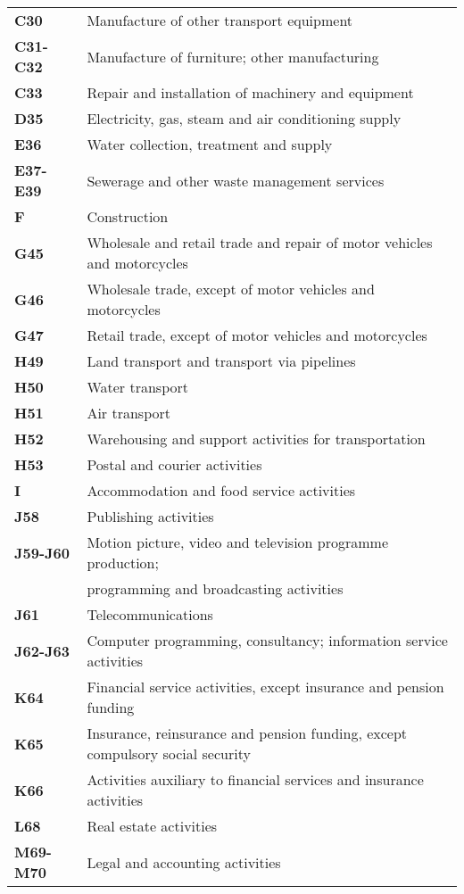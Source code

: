 \documentclass[12pt,a4paper]{article}
\begin{document}
\begin{table}[H]
\begin{tabular}{ll}
\textbf{C30} &{Manufacture of other transport equipment}\\
\textbf{C31-C32} &{Manufacture of furniture; other manufacturing}\\
\textbf{C33} &{Repair and installation of machinery and equipment}\\
\textbf{D35} &{Electricity, gas, steam and air conditioning supply}\\
\textbf{E36} &{Water collection, treatment and supply}\\
\textbf{E37-E39} &{Sewerage and other waste management services}\\
\textbf{F} &{Construction}\\
\textbf{G45} &{Wholesale and retail trade and repair of motor vehicles and motorcycles}\\
\textbf{G46} &{Wholesale trade, except of motor vehicles and motorcycles}\\
\textbf{G47} &{Retail trade, except of motor vehicles and motorcycles}\\
\textbf{H49} &{Land transport and transport via pipelines}\\
\textbf{H50} &{Water transport}\\
\textbf{H51} &{Air transport}\\
\textbf{H52} &{Warehousing and support activities for transportation}\\
\textbf{H53} &{Postal and courier activities}\\
\textbf{I} &{Accommodation and food service activities}\\
\textbf{J58} &{Publishing activities}\\
\textbf{J59-J60} &{Motion picture, video and television programme production;}\\
&{programming and broadcasting activities}\\
\textbf{J61} &{Telecommunications}\\
\textbf{J62-J63} &{Computer programming, consultancy; information service activities}\\
\textbf{K64} &{Financial service activities, except insurance and pension funding}\\
\textbf{K65} &{Insurance, reinsurance and pension funding, except compulsory social security}\\
\textbf{K66} &{Activities auxiliary to financial services and insurance activities}\\
\textbf{L68} &{Real estate activities}\\
\textbf{M69-M70} &{Legal and accounting activities}\\

\end{tabular}
\end{table}
\end{document}
